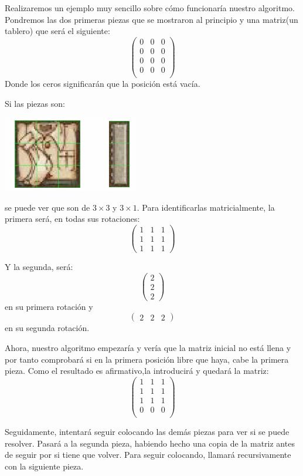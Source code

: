 \documentclass[a4paper, 11pt]{article}
\begin{document}
Realizaremos un ejemplo muy sencillo sobre cómo funcionaría nuestro algoritmo. Pondremos las dos primeras piezas que se mostraron al principio y una matriz(un tablero) que será el siguiente:
\[
\begin{pmatrix}
 0 & 0 & 0 \\
0 & 0 & 0\\
0 & 0 & 0\\
0 & 0 & 0 \\ 
\end{pmatrix} 
\]
Donde los ceros significarán que la posición está vacía.

Si las piezas son:
\begin{center}
	\includegraphics{ejemplo.png}
\end{center}
se puede ver que son de $3\times 3$ y $3\times 1$. Para identificarlas matricialmente, la primera será, en todas sus rotaciones:
\[
\begin{pmatrix}
1 & 1 & 1\\
1& 1 & 1\\
1 & 1 & 1
\end{pmatrix} 
\]

Y la segunda, será:
\[
\begin{pmatrix}
2\\
2\\
2
\end{pmatrix} 
\]
en su primera rotación y
\[
\begin{pmatrix}
2&2&2
\end{pmatrix} 
\]
en su segunda rotación.

Ahora, nuestro algoritmo empezaría y vería que la matriz inicial no está llena y por tanto comprobará si en la primera posición libre que haya, cabe la primera pieza. Como el resultado es afirmativo,la introducirá y quedará la matriz:
\[
\begin{pmatrix}
 1 & 1 & 1 \\
1 & 1 & 1\\
1 & 1 & 1\\
0 & 0 & 0 \\ 
\end{pmatrix} 
\]

Seguidamente, intentará seguir colocando las demás piezas para ver si se puede resolver. Pasará a la segunda pieza, habiendo hecho una copia de la matriz antes de seguir por si tiene que volver. Para seguir colocando, llamará recursivamente con la siguiente pieza.
\end{document}

